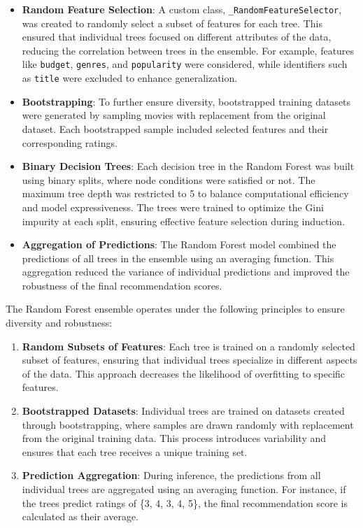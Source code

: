 \documentclass[a3paper,12pt]{article}
\begin{document}
\begin{itemize}
    \item \textbf{Random Feature Selection}:
    A custom class, \texttt{\_RandomFeatureSelector}, was created to randomly select a subset of features for each tree. This ensured that individual trees focused on different attributes of the data, reducing the correlation between trees in the ensemble. For example, features like \texttt{budget}, \texttt{genres}, and \texttt{popularity} were considered, while identifiers such as \texttt{title} were excluded to enhance generalization.
    \item \textbf{Bootstrapping}:
    To further ensure diversity, bootstrapped training datasets were generated by sampling movies with replacement from the original dataset. Each bootstrapped sample included selected features and their corresponding ratings.
    \item \textbf{Binary Decision Trees}:
    Each decision tree in the Random Forest was built using binary splits, where node conditions were satisfied or not. The maximum tree depth was restricted to 5 to balance computational efficiency and model expressiveness. The trees were trained to optimize the Gini impurity at each split, ensuring effective feature selection during induction.
    \item \textbf{Aggregation of Predictions}:
    The Random Forest model combined the predictions of all trees in the ensemble using an averaging function. This aggregation reduced the variance of individual predictions and improved the robustness of the final recommendation scores.
\end{itemize}

The Random Forest ensemble operates under the following principles to ensure diversity and robustness:

\begin{enumerate}
    \item \textbf{Random Subsets of Features}:
    Each tree is trained on a randomly selected subset of features, ensuring that individual trees specialize in different aspects of the data. This approach decreases the likelihood of overfitting to specific features.
    \item \textbf{Bootstrapped Datasets}:
    Individual trees are trained on datasets created through bootstrapping, where samples are drawn randomly with replacement from the original training data. This process introduces variability and ensures that each tree receives a unique training set.
    \item \textbf{Prediction Aggregation}:
    During inference, the predictions from all individual trees are aggregated using an averaging function. For instance, if the trees predict ratings of \{3, 4, 3, 4, 5\}, the final recommendation score is calculated as their average.
\end{enumerate}
\end{document}
